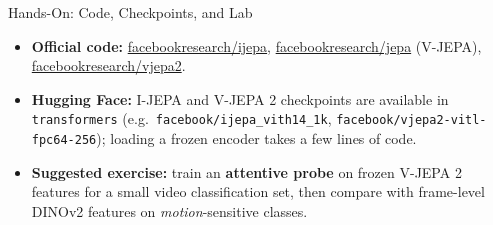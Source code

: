 \begin{frame}{Hands-On: Code, Checkpoints, and Lab}
  \begin{itemize}\itemsep0.3em
    \item[\textcolor{red}{$\blacktriangleright$}] \textbf{Official code:} \href{https://github.com/facebookresearch/ijepa}{facebookresearch/ijepa}, \href{https://github.com/facebookresearch/jepa}{facebookresearch/jepa} (V-JEPA), \href{https://github.com/facebookresearch/vjepa2}{facebookresearch/vjepa2}.
    \item[\textcolor{red}{$\blacktriangleright$}] \textbf{Hugging Face:} I-JEPA and V-JEPA 2 checkpoints are available in \texttt{transformers} (e.g.\ \texttt{facebook/ijepa\_vith14\_1k}, \texttt{facebook/vjepa2-vitl-fpc64-256}); loading a frozen encoder takes a few lines of code.
    \item[\textcolor{red}{$\blacktriangleright$}] \textbf{Suggested exercise:} train an \textbf{attentive probe} on frozen V-JEPA 2 features for a small video classification set, then compare with frame-level DINOv2 features on \emph{motion}-sensitive classes.
  \end{itemize}
\end{frame}
